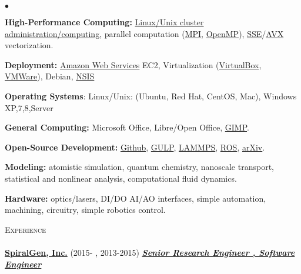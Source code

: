 \documentclass{article}
\newcommand{\lineunder}{\vspace*{-8pt} \\ \hspace*{-18pt} \hrulefill \\}
\newcommand{\header}[1]{{\hspace*{-15pt}\vspace*{6pt} \textsc{#1}} \vspace*{-6pt} \lineunder}
\newcommand{\employer}[3]{{ \textbf{#1} (#2) \underline{\textbf{\emph{#3}}}\\  }}
\newenvironment{achievements}{\begin{list}{$\bullet$}{\topsep 0pt \itemsep -2pt}}{\vspace*{4pt}\end{list}}
\begin{document}
\begin{achievements}
\item \textbf{High-Performance Computing:} \href{http://en.wikipedia.org/wiki/Beowulf_cluster}{Linux/Unix cluster administration/computing}, parallel computation (\href{http://en.wikipedia.org/wiki/Message_Passing_Interface}{MPI}, \href{http://en.wikipedia.org/wiki/OpenMP}{OpenMP}), \href{http://en.wikipedia.org/wiki/Streaming_SIMD_Extensions}{SSE}/\href{http://en.wikipedia.org/wiki/Advanced_Vector_Extensions}{AVX} vectorization.

\item \textbf{Deployment:} \href{http://aws.amazon.com/}{Amazon Web Services} EC2, Virtualization (\href{https://www.virtualbox.org/}{VirtualBox}, \href{http://www.vmware.com/}{VMWare}), Debian, \href{http://nsis.sourceforge.net/Main_Page}{NSIS} 

\item \textbf{Operating Systems}: Linux/Unix: (Ubuntu, Red Hat, CentOS, Mac), Windows XP,7,8,Server

\item \textbf{General Computing:}  Microsoft Office, Libre/Open Office, \href{http://www.gimp.org/}{GIMP}.

\item \textbf{Open-Source Development:} \href{http://github.com/jasonlarkin}{Github}, \href{http://projects.ivec.org/gulp/}{GULP}, \href{http://lammps.sandia.gov/}{LAMMPS}, \href{http://www.ros.org/}{ROS}, \href{http://arxiv.org/find/physics/1/au:+Larkin_J/0/1/0/all/0/1}{arXiv}.

\item \textbf{Modeling:} atomistic simulation, quantum chemistry, nanoscale transport, statistical and nonlinear analysis, computational fluid dynamics. 

\item \textbf{Hardware:} optics/lasers, DI/DO AI/AO interfaces, simple automation, machining, circuitry, simple robotics control.
\end{achievements}






\header{Experience}

\employer{\href{http://spiralgen.com/}{SpiralGen, Inc.}}{2015- , 2013-2015}{Senior Research Engineer , Software Engineer}
\end{document}
